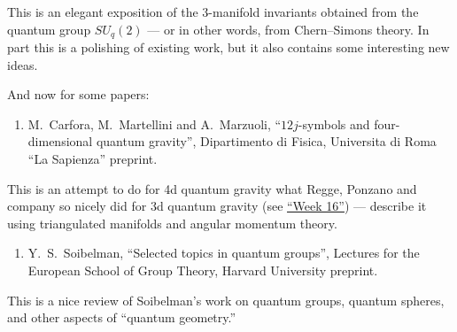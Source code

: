 \documentclass{article}
\def\tightlist{}
\begin{document}
This is an elegant exposition of the 3-manifold invariants obtained from
the quantum group \(SU_q(2)\) --- or in other words, from Chern--Simons
theory. In part this is a polishing of existing work, but it also
contains some interesting new ideas.

And now for some papers:

\begin{enumerate}
\def\labelenumi{\arabic{enumi})}
\setcounter{enumi}{3}
\tightlist
\item
   M.\  Carfora, M.\ Martellini and A.\
  Marzuoli, ``\(12j\)-symbols and four-dimensional quantum gravity'', 
  Dipartimento di Fisica, Universita di Roma ``La Sapienza'' preprint.
\end{enumerate}
\noindent
This is an attempt to do for 4d quantum gravity what Regge, Ponzano and
company so nicely did for 3d quantum gravity (see
\protect\hyperlink{week16}{``Week 16''}) --- describe it using
triangulated manifolds and angular momentum theory.

\begin{enumerate}
\def\labelenumi{\arabic{enumi})}
\setcounter{enumi}{4}
\tightlist
\item
   Y.\ S.\ Soibelman, ``Selected topics in quantum groups'', 
   Lectures for the European School of Group Theory, Harvard University preprint.
\end{enumerate}
\noindent
This is a nice review of Soibelman's work on quantum groups, quantum
spheres, and other aspects of ``quantum geometry.''
\end{document}
